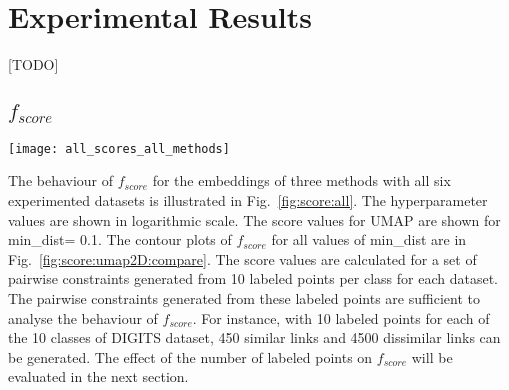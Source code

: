 \section{Experimental Results}\label{sec:results}

[TODO]

\subsection{$f_{score}$}\label{sec:result:fscore}

\begin{figure*}[ht!]
    \centering
    \texttt{[image: all\_scores\_all\_methods]}
    \caption{$f_{score}$ for all three methods for all six datasets.}
    \label{fig:score:all}
\end{figure*}

The behaviour of $f_{score}$ for the embeddings of three methods with all six experimented datasets is illustrated in Fig.~\ref{fig:score:all}.
The hyperparameter values are shown in logarithmic scale.
The score values for UMAP are shown for {min\_dist= 0.1}.
The contour plots of $f_{score}$ for all values of {min\_dist} are in Fig.~\ref{fig:score:umap2D:compare}.
The score values are calculated for a set of pairwise constraints generated from 10 labeled points per class for each dataset.
The pairwise constraints generated from these labeled points are sufficient to analyse the behaviour of $f_{score}$.   
For instance, with 10 labeled points for each of the 10 classes of DIGITS dataset, 450 similar links and 4500 dissimilar links can be generated.
The effect of the number of labeled points on $f_{score}$ will be evaluated in the next section.

